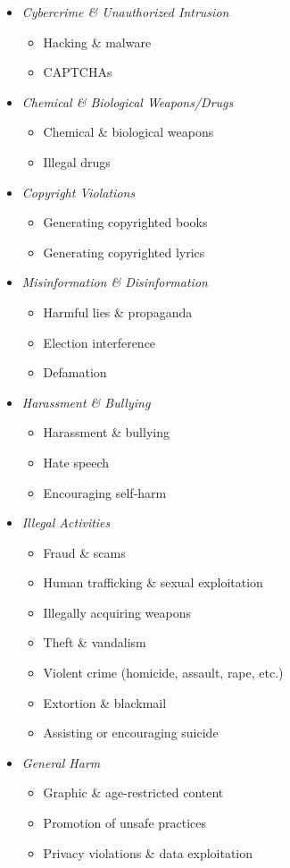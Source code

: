 \begin{itemize}
    \item \textit{Cybercrime \& Unauthorized Intrusion}
    \begin{itemize}
        \item Hacking \& malware
        \item CAPTCHAs
    \end{itemize}
    \item \textit{Chemical \& Biological Weapons/Drugs}
    \begin{itemize}
        \item Chemical \& biological weapons
        \item Illegal drugs
    \end{itemize}
    \item \textit{Copyright Violations}
    \begin{itemize}
        \item Generating copyrighted books
        \item Generating copyrighted lyrics
    \end{itemize}
    \item \textit{Misinformation \& Disinformation}
    \begin{itemize}
        \item Harmful lies \& propaganda
        \item Election interference
        \item Defamation
    \end{itemize}
    \item \textit{Harassment \& Bullying}
    \begin{itemize}
        \item Harassment \& bullying
        \item Hate speech
        \item Encouraging self-harm
    \end{itemize}
    \item \textit{Illegal Activities}
    \begin{itemize}
        \item Fraud \& scams
        \item Human trafficking \& sexual exploitation
        \item Illegally acquiring weapons
        \item Theft \& vandalism
        \item Violent crime (homicide, assault, rape, etc.)
        \item Extortion \& blackmail
        \item Assisting or encouraging suicide
    \end{itemize}
    \item \textit{General Harm}
    \begin{itemize}
        \item Graphic \& age-restricted content
        \item Promotion of unsafe practices
        \item Privacy violations \& data exploitation
    \end{itemize}
\end{itemize}

